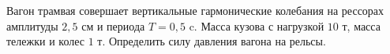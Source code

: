Вагон трамвая совершает вертикальные гармонические колебания на рессорах амплитуды $2,5$ см и периода $T=0,5$ c.
Масса кузова с нагрузкой $10$ т, масса тележки и колес $1$ т. Определить силу давления вагона на рельсы.
